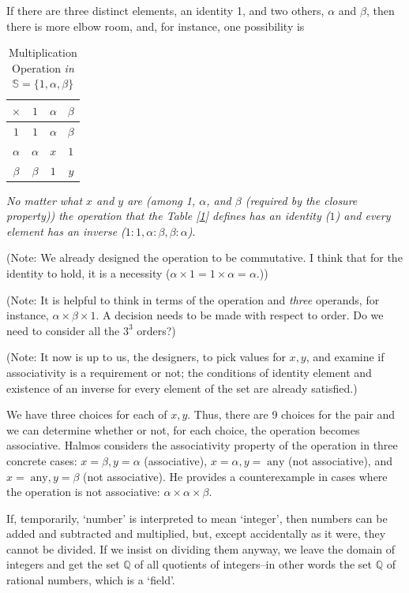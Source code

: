 \documentclass[english,notitlepage,smartquotes]{hgbreport}
\theoremstyle{definition}
\theoremstyle{definition}
\theoremstyle{remark}
\theoremstyle{definition}
\theoremstyle{plain}
\theoremstyle{definition}
\begin{document}
If there are three distinct elements, an identity 1, and two others, $\alpha$ and $\beta$, then there is more elbow room, and, for instance, one possibility is
\begin{table}[h!]
\centering
\begin{tabular}{c|ccc}
$\times$&$1$&$\alpha$&$\beta$\\
\hline
$1$&$1$&$\alpha$&$\beta$\\
$\alpha$&$\alpha$&$x$&$1$\\
$\beta$&$\beta$&$1$&$y$\\
\end{tabular}
\caption{Multiplication Operation \textit{in} $\mathbb{S}=\{1,\alpha,\beta\}$}
\label{tab:set3elem}
\end{table}

\emph{No matter what $x$ and $y$ are (among 1, $\alpha$, and $\beta$ (required by the \emph{closure property})) the operation that the Table [\ref{tab:set3elem}] defines has an identity ($1$) and every element has an inverse ($1:1,\alpha:\beta,\beta:\alpha$)}.

(Note: We already designed the operation to be commutative. I think that for the identity to hold, it is a necessity ($\alpha\times 1=1\times\alpha=\alpha$.))

(Note: It is helpful to think in terms of the operation and \emph{three} operands, for instance, $\alpha\times\beta\times 1$. A decision needs to be made with respect to order. Do we need to consider all the $3^3$ orders?)

(Note: It now is up to us, the designers, to pick values for $x,y$, and examine if associativity is a requirement or not; the conditions of identity element and existence of an inverse for every element of the set are already satisfied.)

We have three choices for each of $x,y$. Thus, there are 9 choices for the pair and we can determine whether or not, for each choice, the operation becomes associative. Halmos considers the associativity property of the operation in three concrete cases: $x=\beta,y=\alpha$ (associative), $x=\alpha,y=\;\text{any}$ (not associative), and $x=\;\text{any},y=\beta$ (not associative). He provides a counterexample in cases where the operation is not associative: $\alpha\times\alpha\times\beta$.


\hrulefill

If, temporarily, `number' is interpreted to mean `integer', then numbers can be added and subtracted and multiplied, but, except accidentally as it were, they cannot be divided. If we insist on dividing them anyway, we leave the
domain of integers and get the set $\mathbb{Q}$ of all quotients of integers--in other words the set $\mathbb{Q}$ of rational numbers, which is a `field'.
\end{document}
